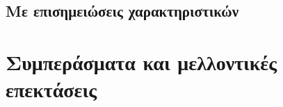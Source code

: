\subsection{Με επισημειώσεις χαρακτηριστικών}
\en{\textcopyright}
\section{Συμπεράσματα και μελλοντικές επεκτάσεις}
